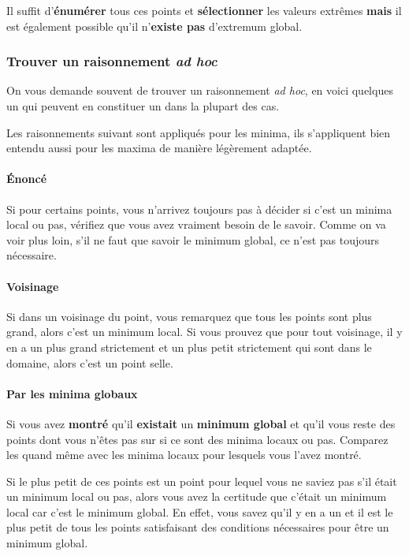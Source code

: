 Il suffit d'\textbf{énumérer} tous ces points et \textbf{sélectionner} les valeurs extrêmes
\textbf{mais} il est également possible qu'il n'\textbf{existe pas} d'extremum global.

\subsubsection{Trouver un raisonnement \emph{ad hoc}}
On vous demande souvent de trouver un raisonnement \emph{ad hoc}, en voici quelques un qui peuvent en constituer un dans la plupart des cas.

Les raisonnements suivant sont appliqués pour les minima, ils s'appliquent bien entendu aussi pour les maxima de manière légèrement adaptée.

\paragraph{Énoncé}
Si pour certains points, vous n'arrivez toujours pas à décider si c'est un minima local ou pas,
vérifiez que vous avez vraiment besoin de le savoir.
Comme on va voir plus loin, s'il ne faut que savoir le minimum global, ce n'est pas toujours nécessaire.

\paragraph{Voisinage}
Si dans un voisinage du point, vous remarquez que tous les points sont plus grand, alors c'est un minimum local.
Si vous prouvez que pour tout voisinage, il y en a un plus grand strictement et un plus petit strictement qui sont dans le domaine,
alors c'est un point selle.

\paragraph{Par les minima globaux}
Si vous avez \textbf{montré} qu'il \textbf{existait} un \textbf{minimum global}
et qu'il vous reste des points dont vous n'êtes pas sur si ce sont des minima locaux ou pas.
Comparez les quand même avec les minima locaux pour lesquels vous l'avez montré.

Si le plus petit de ces points est un point pour lequel vous ne saviez pas s'il était un minimum local ou pas,
alors vous avez la certitude que c'était un minimum local car c'est le minimum global.
En effet, vous savez qu'il y en a un
et il est le plus petit de tous les points satisfaisant des conditions nécessaires pour être un minimum global.

